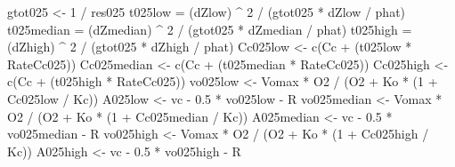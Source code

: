 \documentclass[
]{krantz}
\makeatletter
\newenvironment{Shaded}{\begin{snugshade}}{\end{snugshade}}
\newcommand{\DecValTok}[1]{\textcolor[rgb]{0.00,0.00,0.81}{#1}}
\newcommand{\FloatTok}[1]{\textcolor[rgb]{0.00,0.00,0.81}{#1}}
\newcommand{\FunctionTok}[1]{\textcolor[rgb]{0.00,0.00,0.00}{#1}}
\newcommand{\NormalTok}[1]{#1}
\newcommand{\OtherTok}[1]{\textcolor[rgb]{0.56,0.35,0.01}{#1}}
\newcommand{\SpecialCharTok}[1]{\textcolor[rgb]{0.00,0.00,0.00}{#1}}
\newenvironment{kframe}{%
\medskip{}
\setlength{\fboxsep}{.8em}
 \def\at@end@of@kframe{}%
 \ifinner\ifhmode%
  \def\at@end@of@kframe{\end{minipage}}%
  \begin{minipage}{\columnwidth}%
 \fi\fi%
 \def\FrameCommand##1{\hskip\@totalleftmargin \hskip-\fboxsep
 \colorbox{shadecolor}{##1}\hskip-\fboxsep
     \hskip-\linewidth \hskip-\@totalleftmargin \hskip\columnwidth}%
 \MakeFramed {\advance\hsize-\width
   \@totalleftmargin\z@ \linewidth\hsize
   \@setminipage}}%
 {\par\unskip\endMakeFramed%
 \at@end@of@kframe}
\renewenvironment{Shaded}{\begin{kframe}}{\end{kframe}}
\makeatother
\begin{document}
\begin{Shaded}
\begin{Highlighting}[]
\NormalTok{gtot025 }\OtherTok{\textless{}{-}} \DecValTok{1} \SpecialCharTok{/}\NormalTok{ res025}
\NormalTok{t025low }\OtherTok{=}\NormalTok{ (dZlow) }\SpecialCharTok{\^{}} \DecValTok{2} \SpecialCharTok{/}\NormalTok{ (gtot025 }\SpecialCharTok{*}\NormalTok{ dZlow }\SpecialCharTok{/}\NormalTok{ phat)}
\NormalTok{t025median }\OtherTok{=}\NormalTok{ (dZmedian) }\SpecialCharTok{\^{}} \DecValTok{2} \SpecialCharTok{/}\NormalTok{ (gtot025 }\SpecialCharTok{*}\NormalTok{ dZmedian }\SpecialCharTok{/}\NormalTok{ phat)}
\NormalTok{t025high }\OtherTok{=}\NormalTok{ (dZhigh) }\SpecialCharTok{\^{}} \DecValTok{2} \SpecialCharTok{/}\NormalTok{ (gtot025 }\SpecialCharTok{*}\NormalTok{ dZhigh }\SpecialCharTok{/}\NormalTok{ phat)}
\NormalTok{Cc025low }\OtherTok{\textless{}{-}} \FunctionTok{c}\NormalTok{(Cc }\SpecialCharTok{+}\NormalTok{ (t025low }\SpecialCharTok{*}\NormalTok{ RateCc025))}
\NormalTok{Cc025median }\OtherTok{\textless{}{-}} \FunctionTok{c}\NormalTok{(Cc }\SpecialCharTok{+}\NormalTok{ (t025median }\SpecialCharTok{*}\NormalTok{ RateCc025))}
\NormalTok{Cc025high }\OtherTok{\textless{}{-}} \FunctionTok{c}\NormalTok{(Cc }\SpecialCharTok{+}\NormalTok{ (t025high }\SpecialCharTok{*}\NormalTok{ RateCc025))}
\NormalTok{vo025low }\OtherTok{\textless{}{-}}\NormalTok{ Vomax }\SpecialCharTok{*}\NormalTok{ O2 }\SpecialCharTok{/}\NormalTok{ (O2 }\SpecialCharTok{+}\NormalTok{ Ko }\SpecialCharTok{*}\NormalTok{ (}\DecValTok{1} \SpecialCharTok{+}\NormalTok{ Cc025low }\SpecialCharTok{/}\NormalTok{ Kc)) }
\NormalTok{A025low }\OtherTok{\textless{}{-}}\NormalTok{ vc }\SpecialCharTok{{-}} \FloatTok{0.5} \SpecialCharTok{*}\NormalTok{ vo025low }\SpecialCharTok{{-}}\NormalTok{ R }
\NormalTok{vo025median }\OtherTok{\textless{}{-}}\NormalTok{ Vomax }\SpecialCharTok{*}\NormalTok{ O2 }\SpecialCharTok{/}\NormalTok{ (O2 }\SpecialCharTok{+}\NormalTok{ Ko }\SpecialCharTok{*}\NormalTok{ (}\DecValTok{1} \SpecialCharTok{+}\NormalTok{ Cc025median }\SpecialCharTok{/}\NormalTok{ Kc)) }
\NormalTok{A025median }\OtherTok{\textless{}{-}}\NormalTok{ vc }\SpecialCharTok{{-}} \FloatTok{0.5} \SpecialCharTok{*}\NormalTok{ vo025median }\SpecialCharTok{{-}}\NormalTok{ R }
\NormalTok{vo025high }\OtherTok{\textless{}{-}}\NormalTok{ Vomax }\SpecialCharTok{*}\NormalTok{ O2 }\SpecialCharTok{/}\NormalTok{ (O2 }\SpecialCharTok{+}\NormalTok{ Ko }\SpecialCharTok{*}\NormalTok{ (}\DecValTok{1} \SpecialCharTok{+}\NormalTok{ Cc025high }\SpecialCharTok{/}\NormalTok{ Kc)) }
\NormalTok{A025high }\OtherTok{\textless{}{-}}\NormalTok{ vc }\SpecialCharTok{{-}} \FloatTok{0.5} \SpecialCharTok{*}\NormalTok{ vo025high }\SpecialCharTok{{-}}\NormalTok{ R }


\end{Highlighting}
\end{Shaded}
\end{document}
